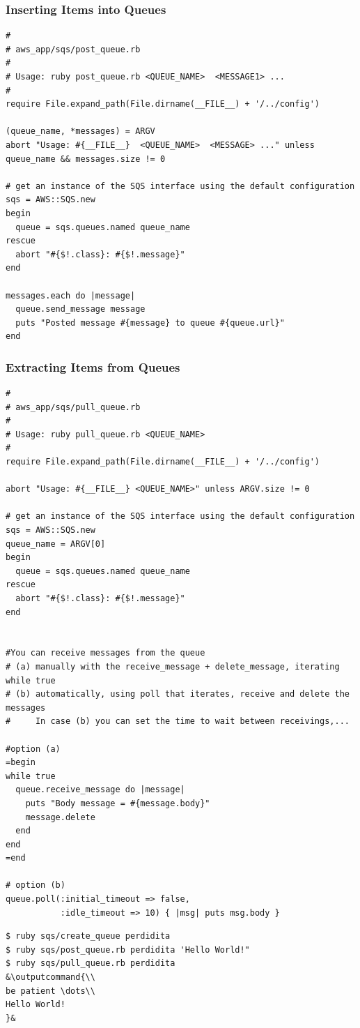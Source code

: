 \documentclass{beamer}
\newcommand{\outputcommand}[1]{\color{darkgreen}{#1|}}
\begin{document}
\begin{frame}
\frametitle{Inserting Items into Queues}
\lstset{language=Ruby, style=eclipse}
\begin{lstlisting}
#
# aws_app/sqs/post_queue.rb
#
# Usage: ruby post_queue.rb <QUEUE_NAME>  <MESSAGE1> ...
#
require File.expand_path(File.dirname(__FILE__) + '/../config')

(queue_name, *messages) = ARGV
abort "Usage: #{__FILE__}  <QUEUE_NAME>  <MESSAGE> ..." unless queue_name && messages.size != 0

# get an instance of the SQS interface using the default configuration
sqs = AWS::SQS.new
begin
  queue = sqs.queues.named queue_name
rescue
  abort "#{$!.class}: #{$!.message}"
end

messages.each do |message|
  queue.send_message message
  puts "Posted message #{message} to queue #{queue.url}"
end
\end{lstlisting}
\end{frame}
\begin{frame}
\frametitle{Extracting Items from Queues}
\lstset{language=Ruby, style=eclipse}
\begin{lstlisting}
#
# aws_app/sqs/pull_queue.rb
#
# Usage: ruby pull_queue.rb <QUEUE_NAME>
#
require File.expand_path(File.dirname(__FILE__) + '/../config')

abort "Usage: #{__FILE__} <QUEUE_NAME>" unless ARGV.size != 0

# get an instance of the SQS interface using the default configuration
sqs = AWS::SQS.new
queue_name = ARGV[0]
begin
  queue = sqs.queues.named queue_name
rescue
  abort "#{$!.class}: #{$!.message}"
end


#You can receive messages from the queue 
# (a) manually with the receive_message + delete_message, iterating while true
# (b) automatically, using poll that iterates, receive and delete the messages
#     In case (b) you can set the time to wait between receivings,...

#option (a)
=begin
while true
  queue.receive_message do |message|
    puts "Body message = #{message.body}"
    message.delete
  end
end
=end

# option (b)
queue.poll(:initial_timeout => false,
           :idle_timeout => 10) { |msg| puts msg.body }
\end{lstlisting}

\lstset{language=shell}
\begin{lstlisting}[escapechar=&]
$ ruby sqs/create_queue perdidita
$ ruby sqs/post_queue.rb perdidita 'Hello World!"
$ ruby sqs/pull_queue.rb perdidita
&\outputcommand{\\
be patient \dots\\
Hello World!
}&
\end{lstlisting}
\end{frame}
\end{document}
